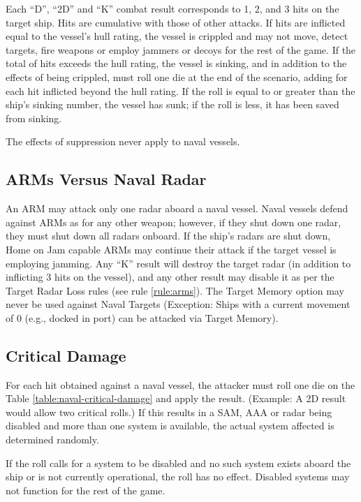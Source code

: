 Each “D”, “2D” and “K” combat result corresponds to 1, 2, and 3 hits on the target ship.  Hits are cumulative with those of other attacks.   If hits are inflicted equal to the vessel's hull rating, the vessel is crippled and may not move, detect targets, fire weapons or employ jammers or decoys for the rest of the game.  If the total of hits exceeds the hull rating, the vessel is sinking, and in addition to the effects of being crippled, must roll one die at the end of the scenario, adding  for each hit inflicted beyond the hull rating.  If the roll is equal to or greater than the ship's sinking number, the vessel has sunk; if the roll is less, it has been saved from sinking.

The effects of suppression never apply to naval vessels.

\subsection{ARMs Versus Naval Radar}  An ARM may attack only one radar aboard a naval vessel.  Naval vessels defend against ARMs as for any other weapon; however, if they shut down one radar, they must shut down all radars onboard.  If the ship's radars are shut down, Home on Jam capable ARMs may continue their attack if the target vessel is employing jamming.   Any “K” result will destroy the target radar (in addition to inflicting 3 hits on the vessel), and any other result may disable it as per the Target Radar Loss rules (see rule \ref{rule:arms}).  The Target Memory option may never be used against Naval Targets (Exception: Ships with a current movement of 0 (e.g., docked in port) can be attacked via Target Memory).

\subsection{Critical Damage} For each hit obtained against a naval vessel, the attacker must roll one die on the Table \ref{table:naval-critical-damage} and apply the result.  (Example: A 2D result would allow two critical rolls.)   If this results in a SAM, AAA or radar being disabled and more than one system is available, the actual system affected is determined randomly.

If the roll calls for a system to be disabled and no such system exists aboard the ship or is not currently operational, the roll has no effect.  Disabled systems may not function for the rest of the game.



